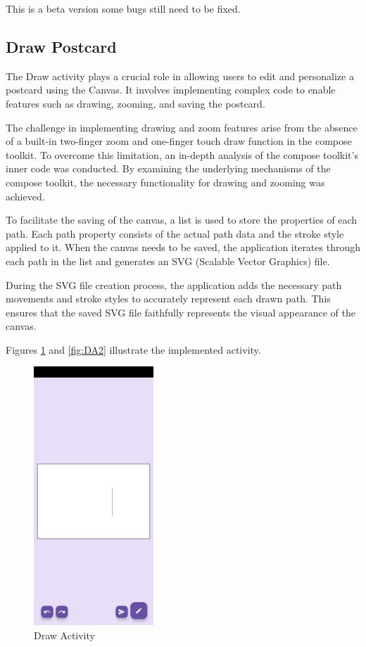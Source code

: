 \bigskip
\bigskip
\bigskip
\bigskip
\bigskip
\bigskip


This is a beta version some bugs still need to be fixed.


\newpage


\subsection{Draw Postcard}
The Draw activity plays a crucial role in allowing users to edit and personalize a postcard using the Canvas. It involves implementing complex code to enable features such as drawing, zooming, and saving the postcard.

The challenge in implementing drawing and zoom features arise from the absence of a built-in two-finger zoom and one-finger touch draw function in the compose toolkit. To overcome this limitation, an in-depth analysis of the compose toolkit's inner code was conducted. By examining the underlying mechanisms of the compose toolkit, the necessary functionality for drawing and zooming was achieved.

To facilitate the saving of the canvas, a list is used to store the properties of each path. Each path property consists of the actual path data and the stroke style applied to it. When the canvas needs to be saved, the application iterates through each path in the list and generates an SVG (Scalable Vector Graphics) file.

During the SVG file creation process, the application adds the necessary path movements and stroke styles to accurately represent each drawn path. This ensures that the saved SVG file faithfully represents the visual appearance of the canvas.

Figures \ref{fig:DA1} and \ref{fig:DA2} illustrate the implemented activity.



\begin{figure}[!ht]
	\centering
	\includegraphics[trim={0cm -3cm 0 -3cm}, width=0.4\textwidth]{./Chapter6/Figures/Draw Postcard}
	\caption{Draw Activity}
	\label{fig:DA1}
\end{figure}

